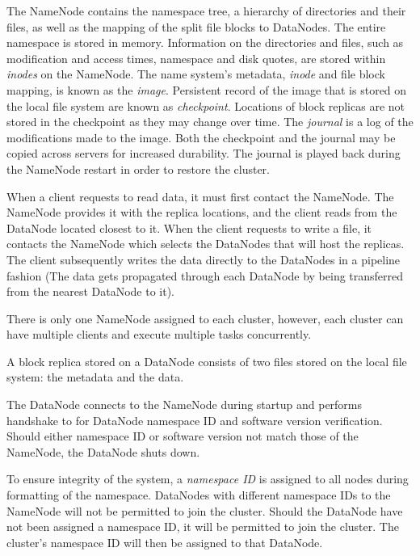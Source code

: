 \documentclass{report}
\begin{document}
        The NameNode contains the namespace tree, a hierarchy of directories and
        their files, as well as the mapping of the split file blocks to
        DataNodes. The entire namespace is stored in memory. Information on the
        directories and files, such as modification and access times, namespace
        and disk quotes, are stored within \textit{inodes} on the NameNode.  The
        name system's metadata, \textit{inode} and file block mapping, is known
        as the \textit{image}. Persistent record of the image that is stored on
        the local file system are known as \textit{checkpoint}. Locations of
        block replicas are not stored in the checkpoint as they may change over
        time. The \textit{journal} is a log of the modifications made to the
        image. Both the checkpoint and the journal may be copied across servers
        for increased durability. The journal is played back during the NameNode
        restart in order to restore the cluster.

        When a client requests to read data, it must first contact the NameNode.
        The NameNode provides it with the replica locations, and the client
        reads from the DataNode located closest to it. When the client requests
        to write a file, it contacts the NameNode which selects the DataNodes
        that will host the replicas. The client subsequently writes the data
        directly to the DataNodes in a pipeline fashion (The data gets
        propagated through each DataNode by being transferred from the nearest
        DataNode to it).

        There is only one NameNode assigned to each cluster, however, each
        cluster can have multiple clients and execute multiple tasks
        concurrently.


        A block replica stored on a DataNode consists of two files stored on the
        local file system: the metadata and the data. 

        The DataNode connects to the NameNode during startup and performs
        handshake to for DataNode namespace ID and software version
        verification. Should either namespace ID or software version not match
        those of the NameNode, the DataNode shuts down.

        To ensure integrity of the system, a \textit{namespace ID} is assigned
        to all nodes during formatting of the namespace.  DataNodes with
        different namespace IDs to the NameNode will not be permitted to join
        the cluster. Should the DataNode have not been assigned a namespace ID,
        it will be permitted to join the cluster. The cluster's namespace ID
        will then be assigned to that DataNode.
\end{document}
